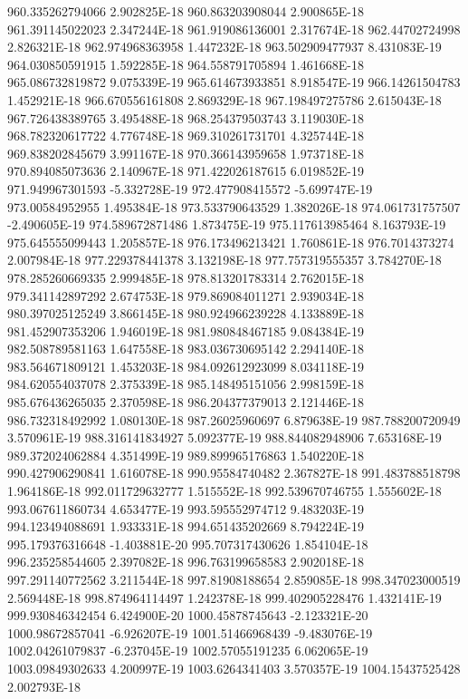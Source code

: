 960.335262794066  2.902825E-18
960.863203908044  2.900865E-18
961.391145022023  2.347244E-18
961.919086136001  2.317674E-18
962.44702724998  2.826321E-18
962.974968363958  1.447232E-18
963.502909477937  8.431083E-19
964.030850591915  1.592285E-18
964.558791705894  1.461668E-18
965.086732819872  9.075339E-19
965.614673933851  8.918547E-19
966.14261504783  1.452921E-18
966.670556161808  2.869329E-18
967.198497275786  2.615043E-18
967.726438389765  3.495488E-18
968.254379503743  3.119030E-18
968.782320617722  4.776748E-18
969.310261731701  4.325744E-18
969.838202845679  3.991167E-18
970.366143959658  1.973718E-18
970.894085073636  2.140967E-18
971.422026187615  6.019852E-19
971.949967301593  -5.332728E-19
972.477908415572  -5.699747E-19
973.00584952955  1.495384E-18
973.533790643529  1.382026E-18
974.061731757507  -2.490605E-19
974.589672871486  1.873475E-19
975.117613985464  8.163793E-19
975.645555099443  1.205857E-18
976.173496213421  1.760861E-18
976.7014373274  2.007984E-18
977.229378441378  3.132198E-18
977.757319555357  3.784270E-18
978.285260669335  2.999485E-18
978.813201783314  2.762015E-18
979.341142897292  2.674753E-18
979.869084011271  2.939034E-18
980.397025125249  3.866145E-18
980.924966239228  4.133889E-18
981.452907353206  1.946019E-18
981.980848467185  9.084384E-19
982.508789581163  1.647558E-18
983.036730695142  2.294140E-18
983.564671809121  1.453203E-18
984.092612923099  8.034118E-19
984.620554037078  2.375339E-18
985.148495151056  2.998159E-18
985.676436265035  2.370598E-18
986.204377379013  2.121446E-18
986.732318492992  1.080130E-18
987.26025960697  6.879638E-19
987.788200720949  3.570961E-19
988.316141834927  5.092377E-19
988.844082948906  7.653168E-19
989.372024062884  4.351499E-19
989.899965176863  1.540220E-18
990.427906290841  1.616078E-18
990.95584740482  2.367827E-18
991.483788518798  1.964186E-18
992.011729632777  1.515552E-18
992.539670746755  1.555602E-18
993.067611860734  4.653477E-19
993.595552974712  9.483203E-19
994.123494088691  1.933331E-18
994.651435202669  8.794224E-19
995.179376316648  -1.403881E-20
995.707317430626  1.854104E-18
996.235258544605  2.397082E-18
996.763199658583  2.902018E-18
997.291140772562  3.211544E-18
997.81908188654  2.859085E-18
998.347023000519  2.569448E-18
998.874964114497  1.242378E-18
999.402905228476  1.432141E-19
999.930846342454  6.424900E-20
1000.45878745643  -2.123321E-20
1000.98672857041  -6.926207E-19
1001.51466968439  -9.483076E-19
1002.04261079837  -6.237045E-19
1002.57055191235  6.062065E-19
1003.09849302633  4.200997E-19
1003.6264341403  3.570357E-19
1004.15437525428  2.002793E-18
